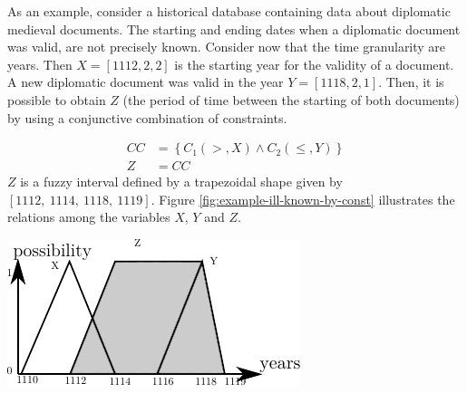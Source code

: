 \begin{example}
As an example, consider a historical database containing data about diplomatic medieval documents. The starting and ending dates when a diplomatic document was valid, are not precisely known.  Consider now that the time granularity are years. Then $X = \left[1112, 2, 2\right]$ is the starting year for the validity of a document. A new diplomatic document was valid in the year $Y = \left[1118, 2, 1 \right]$. Then, it is possible to obtain $Z$ (the period of time between the starting of both documents) by using a conjunctive combination of constraints.

\begin{align}
\nonumber
CC &= \left \lbrace C_1\left(>,X\right) \wedge C_2(\leq,Y) \right \rbrace \\
\nonumber
Z &= CC
\end{align}
$Z$ is a fuzzy interval defined by a trapezoidal shape given by $\left[1112,\ 1114,\ 1118,\ 1119 \right]$.
Figure \ref{fig:example-ill-known-by-const} illustrates the relations among the variables $X$, $Y$ and $Z$.
\end{example}

\begin{samepage}
\vspace*{13pt}
\begin{center}
{
\includegraphics[scale=1]{./graphs/ill-known-by-constraints.pdf}

}
\end{center}
\vspace*{10pt}
\vspace*{13pt}
\end{samepage}

